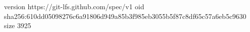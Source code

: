 version https://git-lfs.github.com/spec/v1
oid sha256:610dd05098276c6a91806d949a85b3f985eb3055b5f87c8df65c57a6eb5c9630
size 3925
